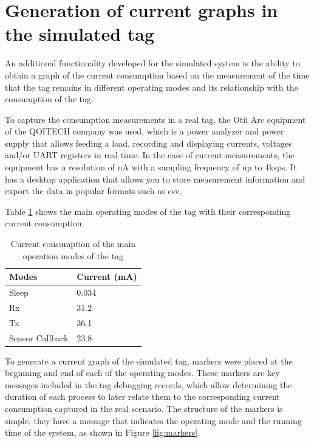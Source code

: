 \documentclass[journal]{IEEEtran}	%
\begin{document}
\section{Generation of current graphs in the simulated tag}
\label{sec:current}

An additional functionality developed for the simulated system is the ability to obtain a graph of the current consumption based on the measurement of the time that the tag remains in different operating modes and its relationship with the consumption of the tag.

To capture the consumption measurements in a real tag, the Otii Arc equipment of the QOITECH company was used, which is a power analyzer and power supply that allows feeding a load, recording and displaying currents, voltages and/or UART registers in real time. In the case of current measurements, the equipment has a resolution of nA with a sampling frequency of up to 4ksps. It has a desktop application that allows you to store measurement information and export the data in popular formats such as csv.

Table \ref{tab:currents} shows the main operating modes of the tag with their corresponding current consumption.

\begin{table}[H]
    \renewcommand{\arraystretch}{1.25}		%
    \centering
    \caption{Current consumption of the main operation modes of the tag}	%
    \label{tab:currents}
    \begin{tabular}{l|l}					%
    \hline \hline
    \textbf{Modes}        &    \textbf{Current (mA)}\\
    \hline
    Sleep               &   0.034\\
    Rx                  &   31.2\\
    Tx                  &   36.1\\
    Sensor Callback     &   23.8\\
    \hline \hline
    \end{tabular}
\end{table}

To generate a current graph of the simulated tag, markers were placed at the beginning and end of each of the operating modes. These markers are key messages included in the tag debugging records, which allow determining the duration of each process to later relate them to the corresponding current consumption captured in the real scenario. The structure of the markers is simple, they have a message that indicates the operating mode and the running time of the system, as shown in Figure \ref{fig:markers}.
\end{document}
